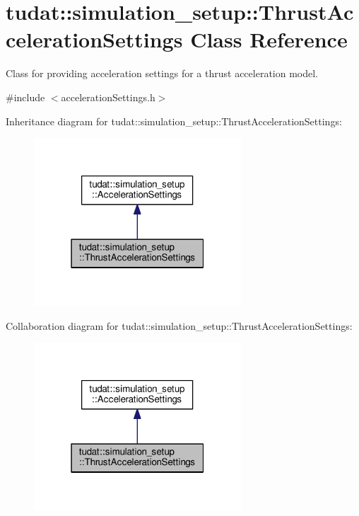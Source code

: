 \hypertarget{classtudat_1_1simulation__setup_1_1ThrustAccelerationSettings}{}\section{tudat\+:\+:simulation\+\_\+setup\+:\+:Thrust\+Acceleration\+Settings Class Reference}
\label{classtudat_1_1simulation__setup_1_1ThrustAccelerationSettings}


Class for providing acceleration settings for a thrust acceleration model.  




{\ttfamily \#include $<$acceleration\+Settings.\+h$>$}



Inheritance diagram for tudat\+:\+:simulation\+\_\+setup\+:\+:Thrust\+Acceleration\+Settings\+:
\nopagebreak
\begin{figure}[H]
\begin{center}
\leavevmode
\includegraphics[width=220pt]{classtudat_1_1simulation__setup_1_1ThrustAccelerationSettings__inherit__graph}
\end{center}
\end{figure}


Collaboration diagram for tudat\+:\+:simulation\+\_\+setup\+:\+:Thrust\+Acceleration\+Settings\+:
\nopagebreak
\begin{figure}[H]
\begin{center}
\leavevmode
\includegraphics[width=220pt]{classtudat_1_1simulation__setup_1_1ThrustAccelerationSettings__coll__graph}
\end{center}
\end{figure}
